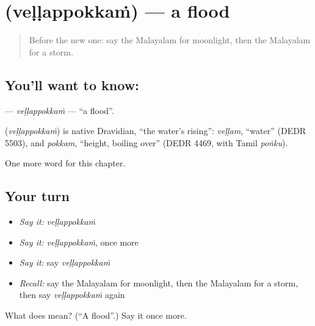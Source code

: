 \section[\texorpdfstring{\ml{വെള്ളപ്പൊക്കം} (veḷḷappokkaṁ)}{വെള്ളപ്പൊക്കം (veḷḷappokkaṁ)}]{ (veḷḷappokkaṁ) — a flood}

\label{lesson:ML-C292-vellappokkam}



\begin{quote}
Before the new one: say the Malayalam for moonlight, then the Malayalam for a storm.
\end{quote}

\subsection*{You'll want to know: }
\textbf{} — \emph{veḷḷappokkaṁ} — \textquotedblleft{}a flood\textquotedblright{}.

\begin{cousinweb}
\textbf{} (\emph{veḷḷappokkaṁ}) is native Dravidian, \textquotedblleft{}the water's rising\textquotedblright{}: \emph{veḷḷam}, \textquotedblleft{}water\textquotedblright{} (DEDR 5503), and \emph{pokkam}, \textquotedblleft{}height, boiling over\textquotedblright{} (DEDR 4469, with Tamil \emph{poṅku}).
\end{cousinweb}

\begin{grammarlens}[title={What you've built}]
One more word for this chapter.
\end{grammarlens}

\subsection*{Your turn}
\begin{itemize}
\raggedright
  \item \emph{Say it:} \emph{veḷḷappokkaṁ}
  \item \emph{Say it:} \emph{veḷḷappokkaṁ}, once more
  \item \emph{Say it:} say \emph{veḷḷappokkaṁ}
  \item \emph{Recall:} say the Malayalam for moonlight, then the Malayalam for a storm, then say \emph{veḷḷappokkaṁ} again
\end{itemize}

\begin{tcolorbox}[breakable,colback=teal!4,colframe=teal!35!black,title={Before you move on}]
What does  mean? (\textquotedblleft{}A flood\textquotedblright{}.) Say it once more.
\end{tcolorbox}
